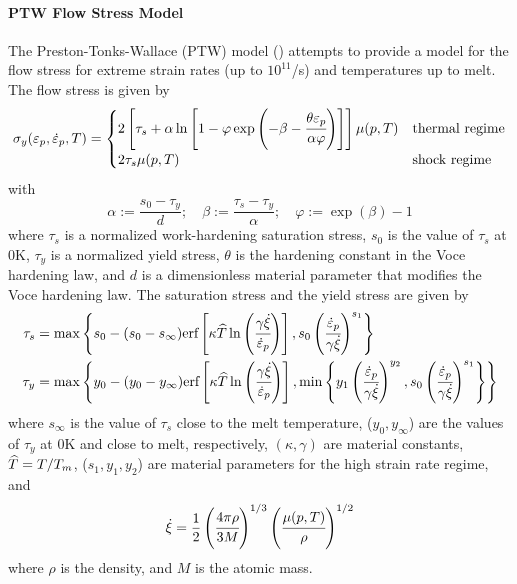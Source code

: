   \paragraph{PTW Flow Stress Model}
  The Preston-Tonks-Wallace (PTW) model (\cite{Preston03}) attempts to 
  provide a model for the flow stress for extreme strain rates 
  (up to $10^{11}$/s) and temperatures up to melt.  The flow stress is
  given by
  \begin{equation}
    \sigma_y(\Ep,\Epdot{},T) = 
       \begin{cases}
         2\left[\tau_s + \alpha\ln\left[1 - \varphi
          \exp\left(-\beta-\cfrac{\theta\Ep}{\alpha\varphi}\right)\right]\right]
         \mu(p,T) & \text{thermal regime} \\
         2\tau_s\mu(p,T) & \text{shock regime}
       \end{cases}
  \end{equation}
  with 
  \begin{equation}
    \alpha := \frac{s_0 - \tau_y}{d}; \quad
    \beta := \frac{\tau_s - \tau_y}{\alpha}; \quad
    \varphi := \exp(\beta) - 1
  \end{equation}
  where $\tau_s$ is a normalized work-hardening saturation stress,
  $s_0$ is the value of $\tau_s$ at 0K,
  $\tau_y$ is a normalized yield stress, $\theta$ is the hardening constant
  in the Voce hardening law, and $d$ is a dimensionless material
  parameter that modifies the Voce hardening law.  The saturation stress
  and the yield stress are given by
  \begin{align}
    \tau_s & = \max\left\{s_0 - (s_0 - s_{\infty})
       \erf\left[\kappa
         \That\ln\left(\cfrac{\gamma\Xidot}{\Epdot{}}\right)\right],
       s_0\left(\cfrac{\Epdot{}}{\gamma\Xidot}\right)^{s_1}\right\} \\
    \tau_y & = \max\left\{y_0 - (y_0 - y_{\infty})
       \erf\left[\kappa
         \That\ln\left(\cfrac{\gamma\Xidot}{\Epdot{}}\right)\right],
       \min\left\{
         y_1\left(\cfrac{\Epdot{}}{\gamma\Xidot}\right)^{y_2}, 
         s_0\left(\cfrac{\Epdot{}}{\gamma\Xidot}\right)^{s_1}\right\}\right\} 
  \end{align}
  where $s_{\infty}$ is the value of $\tau_s$ close to the melt temperature,
  ($y_0, y_{\infty}$) are the values of $\tau_y$ at 0K and close to melt,
  respectively, $(\kappa, \gamma)$ are material constants, $\That = T/T_m$,
  ($s_1, y_1, y_2$) are material parameters for the high strain rate
  regime, and
  \begin{equation}
    \Xidot = \frac{1}{2}\left(\cfrac{4\pi\rho}{3M}\right)^{1/3}
             \left(\cfrac{\mu(p,T)}{\rho}\right)^{1/2}
  \end{equation}
  where $\rho$ is the density, and $M$ is the atomic mass.

